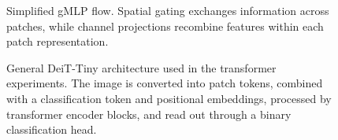 \documentclass[12pt]{article}
\begin{document}
\begin{figure}[t]
  \centering
  \caption{Simplified gMLP flow. Spatial gating exchanges information across patches, while channel projections recombine features within each patch representation.}
  \label{fig:gmlp-flow}
\end{figure}

\begin{figure}[t]
  \centering
  \setlength{\tabcolsep}{3pt}
  \renewcommand{\arraystretch}{1.25}
  \scriptsize
  \caption{General DeiT-Tiny architecture used in the transformer experiments. The image is converted into patch tokens, combined with a classification token and positional embeddings, processed by transformer encoder blocks, and read out through a binary classification head.}
  \label{fig:deit-flow}
\end{figure}
\end{document}
